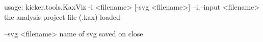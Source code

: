 usage: kicker.tools.KaxViz -i <filename> [-svg <filename>]
 --i,--input <filename>
        the analysis project file (.kax) loaded

 --svg <filename>
        name of svg saved on close
